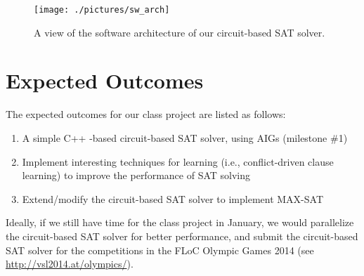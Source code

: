 \documentclass[letter,12pt]{article}
\begin{document}
\begin{figure}
\centering 
\texttt{[image: ./pictures/sw\_arch]}
\caption{A view of the software architecture of our circuit-based SAT solver.}
\label{fig:swarch}
\end{figure}



\section{Expected Outcomes}
\label{sec:expectedoutcomes}


The expected outcomes for our class project are listed as follows: \vspace{-0.3cm}
\begin{enumerate} \itemsep -4pt
\item A simple C++ -based circuit-based SAT solver, using AIGs (milestone \#1)
\item Implement interesting techniques for learning (i.e., conflict-driven clause learning) to improve the performance of SAT solving
\item Extend/modify the circuit-based SAT solver to implement MAX-SAT
\end{enumerate}

Ideally, if we still have time for the class project in January, we would parallelize the circuit-based SAT solver for better performance, and submit the circuit-based SAT solver for the competitions in the FLoC Olympic Games 2014 (see \url{http://vsl2014.at/olympics/}).










{\linespread{1}


}
\end{document}
